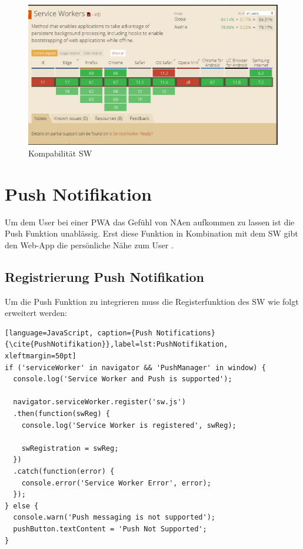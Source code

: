 
\begin{figure}[h]
	\centering
	\includegraphics[width=14cm]{BilderAllgemein/BrowserSW}\medskip
	\caption{Kompabilität \acl{SW} \cite{BrowserSupport}}
	\label{fig:BrowserSW}
\end{figure}


\section{Push Notifikation}
Um dem User bei einer \acs{PWA} das Gefühl von \acl{NA}en aufkommen zu lassen ist die Push Funktion unablässig. Erst diese Funktion in Kombination mit dem \acs{SW} gibt den \acl{Web-App} die persönliche Nähe zum User \cite{PushNotifikation}.



\subsection{Registrierung Push Notifikation}
Um die Push Funktion zu integrieren muss die Registerfunktion des \acs{SW} wie folgt erweitert werden:
 
\begin{lstlisting}[language=JavaScript, caption={Push Notifications} {\cite{PushNotifikation}},label=lst:PushNotifikation, xleftmargin=50pt]
if ('serviceWorker' in navigator && 'PushManager' in window) {
  console.log('Service Worker and Push is supported');

  navigator.serviceWorker.register('sw.js')
  .then(function(swReg) {
    console.log('Service Worker is registered', swReg);

    swRegistration = swReg;
  })
  .catch(function(error) {
    console.error('Service Worker Error', error);
  });
} else {
  console.warn('Push messaging is not supported');
  pushButton.textContent = 'Push Not Supported';
}
\end{lstlisting}


